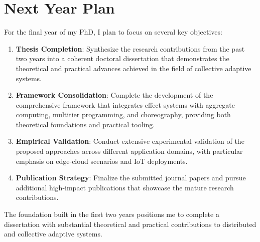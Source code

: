 \documentclass[runningheads]{llncs}
\begin{document}
\section{Next Year Plan}

For the final year of my PhD, I plan to focus on several key objectives:

\begin{enumerate}
\item \textbf{Thesis Completion}: Synthesize the research contributions from the past two years into a coherent doctoral dissertation that demonstrates the theoretical and practical advances achieved in the field of collective adaptive systems.

\item \textbf{Framework Consolidation}: Complete the development of the comprehensive framework that integrates effect systems with aggregate computing, multitier programming, and choreography, providing both theoretical foundations and practical tooling.

\item \textbf{Empirical Validation}: Conduct extensive experimental validation of the proposed approaches across different application domains, with particular emphasis on edge-cloud scenarios and IoT deployments.

\item \textbf{Publication Strategy}: Finalize the submitted journal papers and pursue additional high-impact publications that showcase the mature research contributions.


\end{enumerate}

The foundation built in the first two years positions me to complete a dissertation with substantial theoretical and practical contributions to distributed and collective adaptive systems.

%
%
%



\nocite{*}
\end{document}
